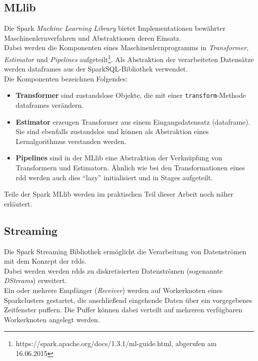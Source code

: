 \subsection{MLlib}
Die Spark \textit{Machine Learning Library} bietet Implementationen bewährter Maschinenlernverfahren und Abstraktionen deren Einsatz.\\
Dabei werden die Komponenten eines Maschinenlernprogramms in \textit{Transformer}, \textit{Estimator} und \textit{Pipelines} aufgeteilt\footnote{https://spark.apache.org/docs/1.3.1/ml-guide.html, abgerufen am 16.06.2015}. Als Abstraktion der verarbeiteten Datensätze werden \glspl{dataframe} aus der SparkSQL-Bibliothek verwendet.\\

Die Komponenten bezeichnen Folgendes:
\begin{itemize}
	\item \textbf{Transformer} sind zustandslose Objekte, die mit einer \lstinline|transform|-Methode \glspl{dataframe} verändern.
	\item \textbf{Estimator} erzeugen Transformer aus einem Eingangsdatensatz (\gls{dataframe}). Sie sind ebenfalls zustandslos und können als Abstraktion eines Lernalgorithmus verstanden werden.
	\item \textbf{Pipelines} sind in der MLlib eine Abstraktion der Verknüpfung von Transformern und Estimatorn. Ähnlich wie bei den Transformationen eines \gls{rdd} werden auch dies "`lazy"' initialisiert und in Stages aufgeteilt.
\end{itemize}

Teile der Spark MLlib werden im praktischen Teil dieser Arbeit noch näher erläutert.\\

\subsection{Streaming}
Die Spark Streaming Bibliothek ermöglicht die Verarbeitung von Datenströmen mit dem Konzept der \glspl{rdd}.\\

Dabei werden werden \glspl{rdd} zu diskretisierten Datenströmen (sogenannte \textit{DStreams}) erweitert.\\

Ein oder mehrere Empfänger (\textit{Receiver}) werden auf Workerknoten eines Sparkclusters gestartet, die anschließend eingehende Daten über ein vorgegebenes Zeitfenster puffern. Die Puffer können dabei verteilt auf mehreren verfügbaren Workerknoten angelegt werden.\\


